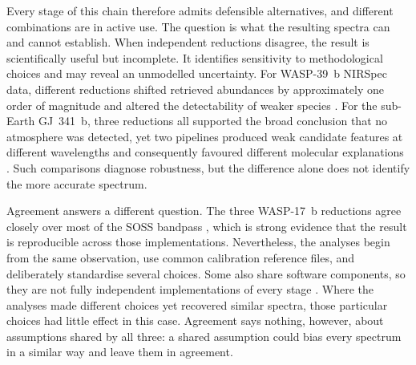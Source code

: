 
Every stage of this chain therefore admits defensible alternatives, and
different combinations are in active use. The question is what the resulting
spectra can and cannot establish. When independent reductions disagree, the
result is scientifically useful but incomplete. It identifies sensitivity to
methodological choices and may reveal an unmodelled uncertainty. For
WASP-39~b NIRSpec data, different reductions shifted retrieved abundances by
approximately one order of magnitude and altered the detectability of weaker
species \citep{ConstantinouEtAl2023}. For the sub-Earth
GJ~341~b, three reductions all supported the broad conclusion that no atmosphere
was detected, yet two pipelines produced weak candidate features at different
wavelengths and consequently favoured different molecular explanations
\citep{KirkEtAl2024}. Such comparisons diagnose robustness, but the difference
alone does not identify the more accurate spectrum.


Agreement answers a different question. The three WASP-17~b reductions agree
closely over most of the SOSS bandpass \citep{LouieEtAl2025}, which is strong
evidence that the result is reproducible across those implementations.
Nevertheless, the analyses begin from the same observation, use common
calibration reference files, and deliberately standardise several choices.
Some also share software components, so they are not fully independent
implementations of every stage
\citep{BellEtAl2022,RadicaEtAl2023,LouieEtAl2025}. Where the analyses made
different choices yet recovered similar spectra, those particular choices had
little effect in this case. Agreement says nothing, however, about assumptions
shared by all three: a shared assumption could bias every spectrum in a
similar way and leave them in agreement.


